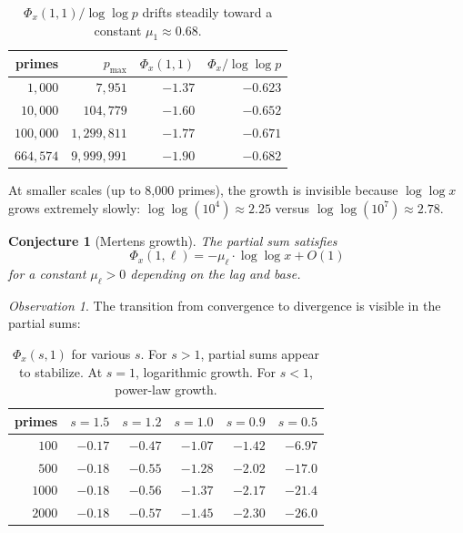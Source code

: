 \documentclass[12pt]{amsart}
\newtheorem{conjecture}[theorem]{Conjecture}
\theoremstyle{definition}
\theoremstyle{remark}
\newtheorem{observation}[theorem]{Observation}
\begin{document}
\begin{table}[h]
\centering
\begin{tabular}{rrrr}
\toprule
primes & $p_{\max}$ & $\Phi_x(1,1)$ & $\Phi_x/\log\log p$ \\
\midrule
$1{,}000$ & $7{,}951$ & $-1.37$ & $-0.623$ \\
$10{,}000$ & $104{,}779$ & $-1.60$ & $-0.652$ \\
$100{,}000$ & $1{,}299{,}811$ & $-1.77$ & $-0.671$ \\
$664{,}574$ & $9{,}999{,}991$ & $-1.90$ & $-0.682$ \\
\bottomrule
\end{tabular}
\caption{$\Phi_x(1,1)/\log\log p$ drifts steadily toward a
constant $\mu_1 \approx 0.68$.}
\end{table}

At smaller scales (up to 8,000 primes), the growth is invisible
because $\log\log x$ grows extremely slowly:
$\log\log(10^4) \approx 2.25$ versus
$\log\log(10^7) \approx 2.78$.

\begin{conjecture}[Mertens growth]\label{conj:mertens}
The partial sum satisfies
\[
\Phi_x(1, \ell) = -\mu_{\ell} \cdot \log\log x + O(1)
\]
for a constant $\mu_{\ell} > 0$ depending on the lag and base.
\end{conjecture}

\begin{observation}\label{obs:transition}
The transition from convergence to divergence is visible
in the partial sums:

\begin{table}[h]
\centering
\begin{tabular}{rrrrrr}
\toprule
primes & $s = 1.5$ & $s = 1.2$ & $s = 1.0$ & $s = 0.9$ &
$s = 0.5$ \\
\midrule
$100$ & $-0.17$ & $-0.47$ & $-1.07$ & $-1.42$ & $-6.97$ \\
$500$ & $-0.18$ & $-0.55$ & $-1.28$ & $-2.02$ & $-17.0$ \\
$1000$ & $-0.18$ & $-0.56$ & $-1.37$ & $-2.17$ & $-21.4$ \\
$2000$ & $-0.18$ & $-0.57$ & $-1.45$ & $-2.30$ & $-26.0$ \\
\bottomrule
\end{tabular}
\caption{$\Phi_x(s, 1)$ for various $s$. For $s > 1$, partial
sums appear to stabilize. At $s = 1$, logarithmic growth.
For $s < 1$, power-law growth.}
\end{table}
\end{observation}
\end{document}
